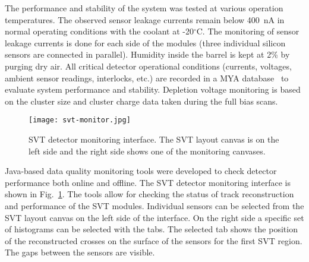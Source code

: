 The performance and stability of the system was tested at various operation temperatures. The observed sensor
leakage currents remain below 400~nA in normal operating conditions with the coolant at -20$^\circ$C. The
monitoring of sensor leakage currents is done for each side of the modules (three individual silicon sensors are
connected in parallel). Humidity inside the barrel is kept at 2\% by purging dry air. All critical detector operational
conditions (currents, voltages, ambient sensor readings, interlocks, etc.) are recorded in a MYA database~\cite{MYA}
to evaluate system performance and stability. Depletion voltage monitoring is based on the cluster size and cluster
charge data taken during the full bias scans.

\begin{figure}[hbt] 
\centering 
\texttt{[image: svt-monitor.jpg]}
\caption{SVT detector monitoring interface. The SVT layout canvas is on the left side and the right side shows one
  of the monitoring canvases.}
\label{fig:svt-monitor}
\end{figure}

Java-based data quality monitoring tools were developed to check detector performance both online and offline. The
SVT detector monitoring interface is shown in Fig.~\ref{fig:svt-monitor}. The tools allow for checking the status of
track reconstruction and performance of the SVT modules. Individual sensors can be selected from the SVT layout
canvas on the left side of the interface. On the right side a specific set of histograms can be selected with the tabs.
The selected tab shows the position of the reconstructed crosses on the surface of the sensors for the first SVT
region. The gaps between the sensors are visible.


